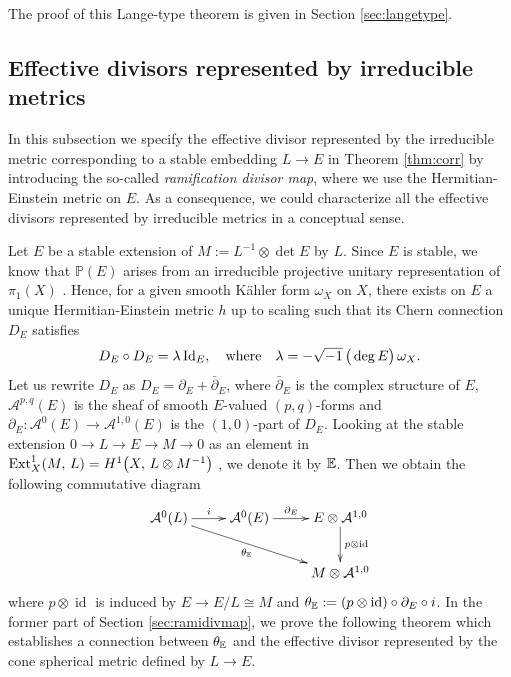 \documentclass[12pt]{article}
\begin{document}
The proof of this Lange-type theorem is given in Section \ref{sec:langetype}.

\subsection{Effective divisors represented by irreducible metrics}
\label{subsec:rami}

In this subsection we specify the effective divisor represented by the irreducible metric corresponding to a stable embedding $L \to E$ in Theorem \ref{thm:corr} by introducing the so-called {\it ramification divisor map}, where we use the Hermitian-Einstein metric on $E$. As a consequence, we could characterize
all the effective divisors represented by irreducible metrics in a conceptual sense.

Let $E$ be a stable extension of $M := L^{-1} \otimes \det E$ by $L$. Since $E$ is stable,  we know that $\mathbb P(E)$ arises from an irreducible projective unitary representation of $\pi_{1}(X)$ \cite{NS1965}. Hence, for a given smooth K\" ahler form $\omega_X$ on $X$, there exists on $E$ a unique Hermitian-Einstein metric $h$ up to scaling such that its Chern connection $D_E$ satisfies
\[ D_{E} \circ D_{E} = \lambda \, {\rm Id}_E,\quad {\rm where}\quad \lambda=-\sqrt{-1} \,\big(\deg E\big) \,\omega_X. \]
Let us rewrite $D_E$ as
$D_{E} = \partial_{E} + \bar{\partial}_{E}$,
where $\bar{\partial}_{E}$ is the complex structure of $E$, $\mathcal{A}^{p,q}(E)$ is the sheaf of smooth $E$-valued $(p,q)$-forms and $\partial_{E}\colon \mathcal{A}^{0}(E) \rightarrow \mathcal{A}^{1,0}(E)$ is the $(1,0)$-part of $D_{E}$.
Looking at the stable extension $0\to L\to E\to M \to 0$ as an element in
 ${\rm Ext}_{X}^1(M,\,L)=H^1\big(X,\, L\otimes M^{-1}\big)$ \cite[Proposition 2]{Atiyah57I}, we denote it by
${\Bbb E}$.
Then we obtain the following commutative diagram
\[\xymatrix{
\mathcal A^{0}(L)\ar[r] ^-{i}\ar[drr]_-{\theta_{\Bbb E}} & \mathcal A^{0}(E)\ar[r] ^-{\partial_{E}} & E\otimes \mathcal{A}^{1,0}\ar[d]^-{p \otimes \operatorname{id}} \\
 & & M \otimes \mathcal{A}^{1,0}
}\]
where $p \otimes \operatorname{id}$ is induced by $E \rightarrow E/L \cong M$ and $\theta_{\Bbb E} := (p \otimes \operatorname{id}) \circ \partial_{E} \circ i$. In the former part of Section \ref{sec:ramidivmap}, we  prove the following theorem which establishes a connection between $\theta_{\Bbb E}$ and the effective divisor represented by the cone spherical metric defined by $L\to E$.
\end{document}
